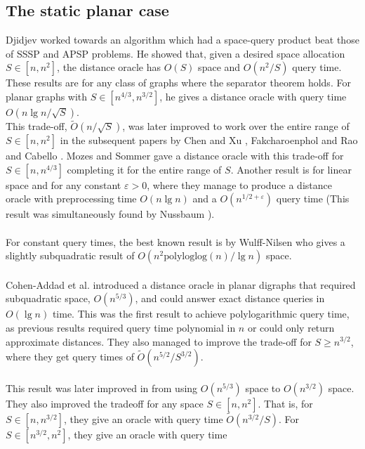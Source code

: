 \subsection{The static planar case}\label{surveyplanar}
Djidjev \cite{djidjev1996efficient} worked towards an algorithm which had a space-query
product beat those of SSSP and APSP problems. He showed that, given a desired space
allocation $S\in [n, n^2]$, the distance oracle has $O(S)$ space and $O(n^2/S)$
query time. These results are for any class of graphs where the separator theorem holds. For planar graphs
with $S\in [n^{4/3}, n^{3/2}]$, he gives a distance oracle with query time $O(n\lg
n/\sqrt{S})$. \\
This trade-off, $\tilde{O}(n/\sqrt{S})$, was later improved to work over the entire range
of $S\in [n,n^2]$ in the subsequent papers by Chen and Xu \cite{chen2000shortest},
Fakcharoenphol and Rao \cite{fakcharoenphol2006planar} and Cabello
\cite{cabello2006many}. Mozes and Sommer \cite{mozes2012exact} gave a distance oracle
with this trade-off for $S\in [n, n^{4/3}]$ completing it for the entire range of $S$. Another result is for
linear space and for any constant $\varepsilon > 0$, where they manage to produce a distance oracle with preprocessing time
$O(n\lg n)$ and a $O(n^{1/2+\varepsilon})$ query time (This result
was simultaneously found by Nussbaum \cite{nussbaum2011improved}). \\
\\
For constant query times, the best known result is by Wulff-Nilsen
\cite{wulff2010algorithms} who gives a slightly subquadratic result of
$O(n^2\text{polyloglog}(n)/\lg n)$ space. \\
\\
Cohen-Addad et al. \cite{cohen2017fast} introduced a distance
oracle in planar digraphs that required subquadratic space, $O(n^{5/3})$, and could answer exact distance queries in
$O(\lg n)$ time. This was the first result to achieve polylogarithmic query time, as previous
results required query time polynomial in $n$ or could only return approximate distances.
They also managed to improve the trade-off for $S\geq n^{3/2}$, where they get query
times of $\tilde{O}(n^{5/2}/S^{3/2})$. \\
\\
This result was later improved in \cite{gawrychowski2017better} from using $O(n^{5/3})$
space to $O(n^{3/2})$ space. They also improved the tradeoff for any space $S\in [n,n^2]$.
That is, for $S\in [n, n^{3/2}]$, they give an oracle with query time
$\tilde{O}(n^{3/2}/S)$. For $S\in [n^{3/2}, n^2]$, they give an oracle with query time
